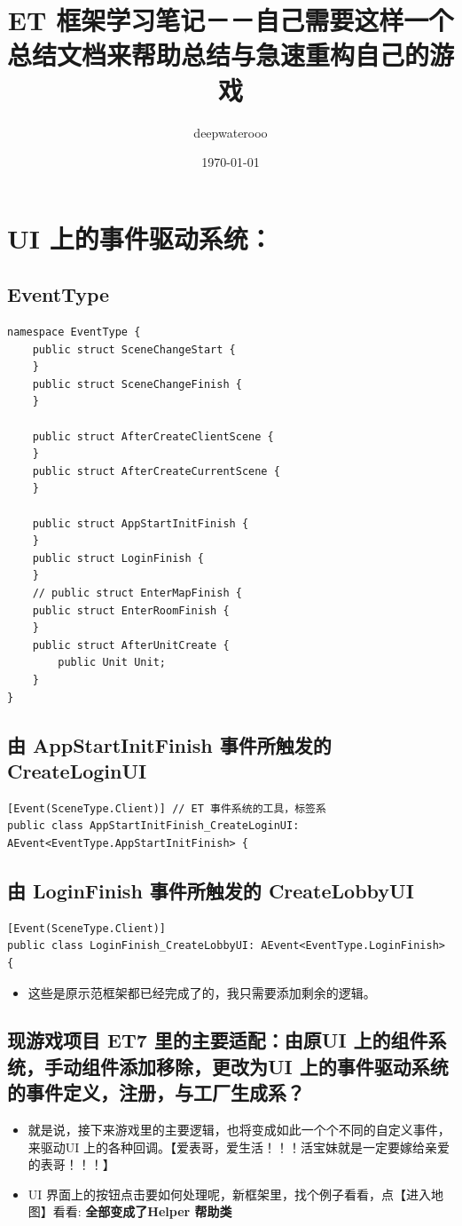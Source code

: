 \documentclass[9pt, b5paper]{article}
\author{deepwaterooo}
\date{\today}
\title{ET 框架学习笔记－－自己需要这样一个总结文档来帮助总结与急速重构自己的游戏}
\begin{document}
\maketitle
\tableofcontents


\section{UI 上的事件驱动系统：}
\label{sec-1}
\subsection{EventType}
\label{sec-1-1}
\begin{verbatim}
namespace EventType {
    public struct SceneChangeStart {
    }
    public struct SceneChangeFinish {
    }

    public struct AfterCreateClientScene {
    }
    public struct AfterCreateCurrentScene {
    }

    public struct AppStartInitFinish {
    }
    public struct LoginFinish {
    }
    // public struct EnterMapFinish {
    public struct EnterRoomFinish {
    }
    public struct AfterUnitCreate {
        public Unit Unit;
    }
}
\end{verbatim}
\subsection{由 AppStartInitFinish 事件所触发的 CreateLoginUI}
\label{sec-1-2}
\begin{verbatim}
[Event(SceneType.Client)] // ET 事件系统的工具，标签系
public class AppStartInitFinish_CreateLoginUI: AEvent<EventType.AppStartInitFinish> {
\end{verbatim}
\subsection{由 LoginFinish 事件所触发的 CreateLobbyUI}
\label{sec-1-3}
\begin{verbatim}
[Event(SceneType.Client)]
public class LoginFinish_CreateLobbyUI: AEvent<EventType.LoginFinish> {
\end{verbatim}
\begin{itemize}
\item 这些是原示范框架都已经完成了的，我只需要添加剩余的逻辑。
\end{itemize}
\subsection{现游戏项目 ET7 里的主要适配：由原UI 上的组件系统，手动组件添加移除，更改为UI 上的事件驱动系统的事件定义，注册，与工厂生成系？}
\label{sec-1-4}
\begin{itemize}
\item 就是说，接下来游戏里的主要逻辑，也将变成如此一个个不同的自定义事件，来驱动UI 上的各种回调。【爱表哥，爱生活！！！活宝妹就是一定要嫁给亲爱的表哥！！！】
\item UI 界面上的按钮点击要如何处理呢，新框架里，找个例子看看，点【进入地图】看看: \textbf{全部变成了Helper 帮助类}
\end{itemize}
\end{document}
